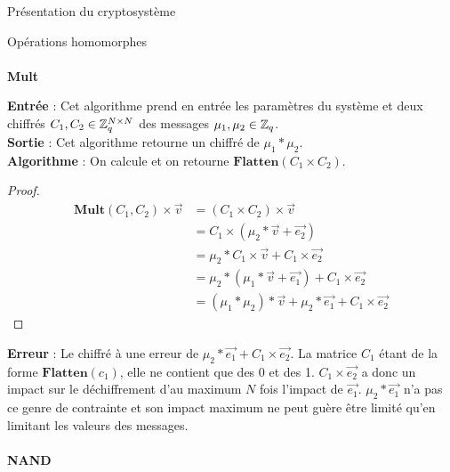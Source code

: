 \begin{section}{Présentation du cryptosystème}
\begin{subsection}{Opérations homomorphes}
	\paragraph{}
	\textbf{Mult}
	\flushleft
	
	\textbf{Entrée} : Cet algorithme prend en entrée les paramètres du système et deux chiffrés $C_1, C_2 \in \mathbb{Z}_q^{N \times N}$ des messages $\mu_1, \mu_2 \in \mathbb{Z}_q$.\\
	\textbf{Sortie} : Cet algorithme retourne un chiffré de $\mu_1 * \mu_2$. \\
	\textbf{Algorithme} : On calcule et on retourne $\textbf{Flatten}(C_1 \times C_2)$.
	\begin{proof}
	\begin{align*}
	\textbf{Mult}(C_1, C_2) \times \vec{v} &= (C_1 \times C_2) \times \vec{v} \\
	&= C_1 \times (\mu_2 * \vec{v} + \vec{e_2}) \\
	&= \mu_2 * C_1 \times \vec{v} + C_1 \times \vec{e_2} \\
	&= \mu_2 * (\mu_1 * \vec{v} + \vec{e_1}) + C_1 \times \vec{e_2} \\
	&= (\mu_1 * \mu_2) * \vec{v} + \mu_2 * \vec{e_1} + C_1 \times \vec{e_2}
	\end{align*}
	\end{proof}
	\textbf{Erreur} : Le chiffré à une erreur de $\mu_2 * \vec{e_1} + C_1 \times \vec{e_2}$. La matrice $C_1$ étant de la forme $\textbf{Flatten}(c_1)$, elle ne contient que des 0 et des 1. $C_1 \times \vec{e_2}$ a donc un impact sur le déchiffrement d'au maximum $N$ fois l'impact de $\vec{e_1}$. $\mu_2 * \vec{e_1}$ n'a pas ce genre de contrainte et son impact maximum ne peut guère être limité qu'en limitant les valeurs des messages.
	
	\paragraph{}
	\textbf{NAND}
	\flushleft
	

\end{subsection}
\end{section}
